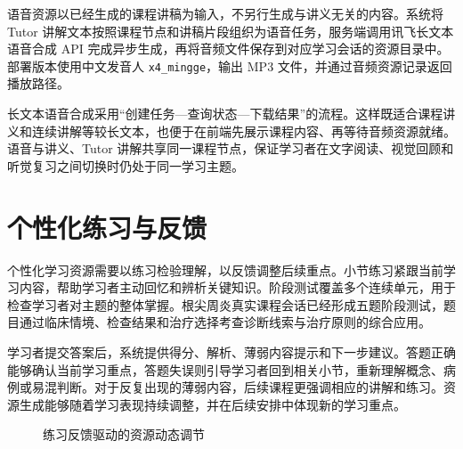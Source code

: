 语音资源以已经生成的课程讲稿为输入，不另行生成与讲义无关的内容。系统将 Tutor 讲解文本按照课程节点和讲稿片段组织为语音任务，服务端调用讯飞长文本语音合成 API 完成异步生成，再将音频文件保存到对应学习会话的资源目录中。部署版本使用中文发音人 \texttt{x4\_mingge}，输出 MP3 文件，并通过音频资源记录返回播放路径。

长文本语音合成采用“创建任务—查询状态—下载结果”的流程。这样既适合课程讲义和连续讲解等较长文本，也便于在前端先展示课程内容、再等待音频资源就绪。语音与讲义、Tutor 讲解共享同一课程节点，保证学习者在文字阅读、视觉回顾和听觉复习之间切换时仍处于同一学习主题。

\section{个性化练习与反馈}

个性化学习资源需要以练习检验理解，以反馈调整后续重点。小节练习紧跟当前学习内容，帮助学习者主动回忆和辨析关键知识。阶段测试覆盖多个连续单元，用于检查学习者对主题的整体掌握。根尖周炎真实课程会话已经形成五题阶段测试，题目通过临床情境、检查结果和治疗选择考查诊断线索与治疗原则的综合应用。

学习者提交答案后，系统提供得分、解析、薄弱内容提示和下一步建议。答题正确能够确认当前学习重点，答题失误则引导学习者回到相关小节，重新理解概念、病例或易混判断。对于反复出现的薄弱内容，后续课程更强调相应的讲解和练习。资源生成能够随着学习表现持续调整，并在后续安排中体现新的学习重点。

\begin{figure}[H]
  \centering
  \caption{练习反馈驱动的资源动态调节}
  \label{fig:personalized-feedback-loop}
\end{figure}

